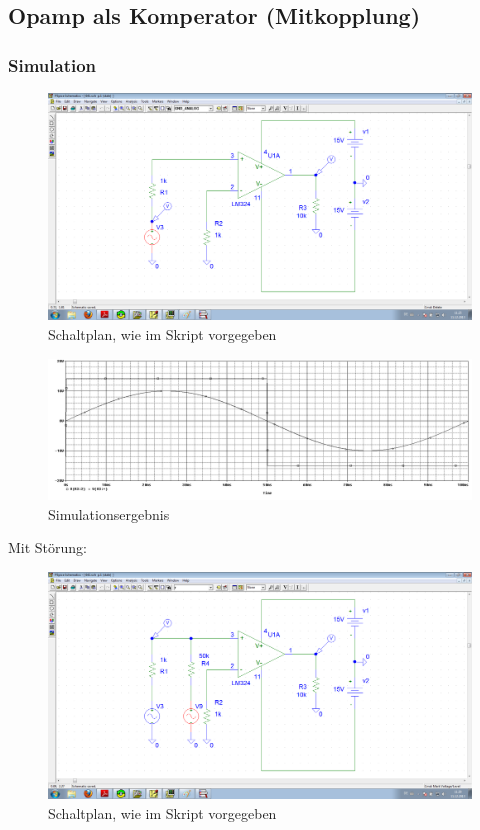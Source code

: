 \subsection{Opamp als Komperator (Mitkopplung)}
\subsubsection*{Simulation}
\begin{figure}[H]
	\centering
	\includegraphics[width=\linewidth]{versuch6/spice/schem641.png}
	\caption{Schaltplan, wie im Skript vorgegeben}
\end{figure}
\begin{figure}[H]
	\centering
	\includegraphics[width=\linewidth]{versuch6/spice/641.png}
	\caption{Simulationsergebnis}
\end{figure}
Mit Störung:
\begin{figure}[H]
	\centering
	\includegraphics[width=\linewidth]{versuch6/spice/schem642.png}
	\caption{Schaltplan, wie im Skript vorgegeben}
\end{figure}
